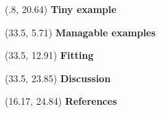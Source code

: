 \documentclass[extrafontsizes, 30pt]{memoir}
\begin{document}
\begin{textblock}{14.08}(.8, 20.64)
{\large \bfseries Tiny example}

\end{textblock}

\begin{textblock}{14.08}(33.5, 5.71)
{\large \bfseries Managable examples}
\end{textblock}

\begin{textblock}{14.08}(33.5, 12.91)
{\large \bfseries Fitting}

\end{textblock}

\begin{textblock}{14.08}(33.5, 23.85)
{\large \bfseries Discussion}
\end{textblock}

\begin{textblock}{15.08}(16.17, 24.84)
{\large \bfseries References}
\end{textblock}
\end{document}
